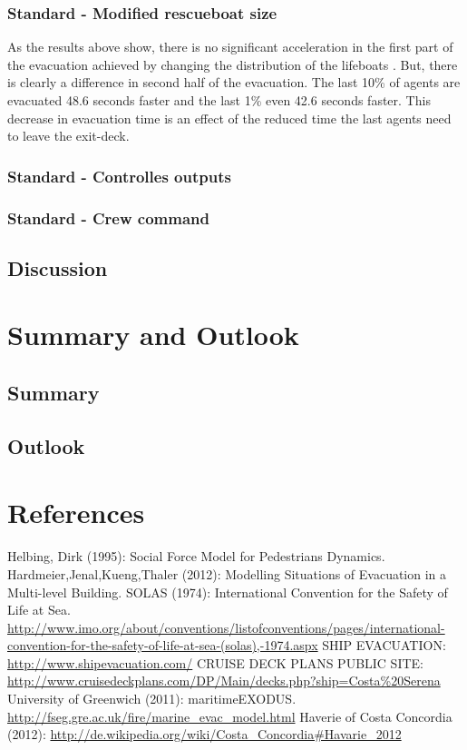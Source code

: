 \documentclass[11pt]{article}
\begin{document}
\subsubsection{Standard - Modified rescueboat size}

As the results above show, there is no significant acceleration in the first part of the evacuation achieved by changing the distribution of the lifeboats .  
 But, there is clearly a difference in second half of the evacuation. The last 10\% of agents are evacuated 48.6 seconds faster and the last 1\% even 42.6 seconds faster. 
This decrease in evacuation time is an effect of the reduced time the last agents need to leave the exit-deck.

\subsubsection{Standard - Controlles outputs}
\subsubsection{Standard - Crew command}
\subsection{Discussion}
\section{Summary and Outlook}
\subsection{Summary}
\subsection{Outlook}
\section{References}

\begin{thebibliography}{9}
 Helbing, Dirk (1995): Social Force Model for Pedestrians Dynamics.
 Hardmeier,Jenal,Kueng,Thaler (2012): Modelling Situations of Evacuation in a Multi-level Building.
 SOLAS (1974): International Convention for the Safety of Life at Sea. \url{http://www.imo.org/about/conventions/listofconventions/pages/international-convention-for-the-safety-of-life-at-sea-(solas),-1974.aspx}
 SHIP EVACUATION: \url{http://www.shipevacuation.com/}
 CRUISE DECK PLANS PUBLIC SITE: \url{http://www.cruisedeckplans.com/DP/Main/decks.php?ship=Costa%20Serena}
 University of Greenwich (2011):  maritimeEXODUS. \url{http://fseg.gre.ac.uk/fire/marine_evac_model.html}
 Haverie of Costa Concordia (2012): \url{http://de.wikipedia.org/wiki/Costa_Concordia#Havarie_2012}
	
\end{thebibliography}
\end{document}
